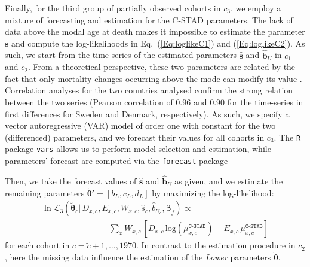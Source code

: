\documentclass[11pt, a4paper]{article}
\begin{document}
Finally, for the third group of partially observed cohorts in $c_3$, we employ a mixture of forecasting and estimation for the C-STAD parameters. The lack of data above the modal age at death makes it impossible to estimate the parameter $\bm{s}$ and compute the log-likelihoods in Eq.~(\ref{Eq:loglikeC1}) and (\ref{Eq:loglikeC2}). As such, we start from the time-series of the estimated parameters $\hat{\bm{s}}$ and $\hat{\bm{b}}_U$ in $c_1$ and $c_2$. From a theoretical perspective, these two parameters are related by the fact that only mortality changes occurring above the mode can modify its value \cite[cf.~Appendix B in][]{canudas2010three}. Correlation analyses for the two countries analysed confirm the strong relation between the two series (Pearson correlation of 0.96 and 0.90 for the time-series in first differences for Sweden and Denmark, respectively). As such, we specify a vector autoregressive (VAR) model of order one with constant for the two (differenced) parameters, and we forecast their values for all cohorts in $c_3$. The \texttt{R} package \texttt{vars} allows us to perform model selection and estimation, while parameters' forecast are computed via the \texttt{forecast} package  \citep{pfaff2008analysis,pfaff2008var,hyndman2018forecastR}  \par


Then, we take the forecast values of $\hat{\bm{s}}$ and $\hat{\bm{b}}_U$ as given, and we estimate the remaining parameters $\breve{\bm{\theta}}'=\left[b_{L},c_{L},d_{L}\right]$ by maximizing the log-likelihood:
\begin{equation}\label{Eq:loglikeC3}
\begin{aligned}
\ln\mathcal{L}_3\left(\breve{\bm{\theta}}_c | \, D_{x,c} , E_{x,c} , W_{x,c} , \hat{s}_{c}, \hat{b}_{U_{c}} , \bm{\beta}_{f} \right) \propto \qquad\qquad\qquad\qquad \\ \qquad\qquad\qquad\qquad \sum_{x} W_{x,c} \, \left[  D_{x,c} \,
\mathrm{log} \left( \mu^{\texttt{C-STAD}}_{x,c}  \right) - E_{x,c}
\, \mu^{\texttt{C-STAD}}_{x,c} \right] 
\end{aligned}
\end{equation}
for each cohort in $c=\tilde{c}+1,\ldots,1970$. In contrast to the estimation procedure in $c_2$, here the missing data influence the estimation of the \textit{Lower} parameters $\breve{\bm{\theta}}$. \par
\end{document}
